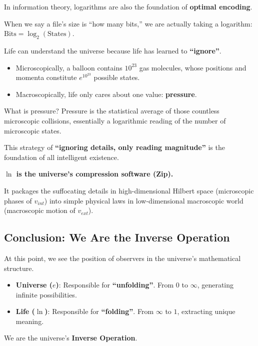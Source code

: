 \documentclass[11pt,a4paper,twoside]{book}
\begin{document}
In information theory, logarithms are also the foundation of \textbf{optimal encoding}.

When we say a file's size is ``how many bits,'' we are actually taking a logarithm: $\text{Bits} = \log_2(\text{States})$.

Life can understand the universe because life has learned to \textbf{``ignore''}.

\begin{itemize}
\item Microscopically, a balloon contains $10^{23}$ gas molecules, whose positions and momenta constitute $e^{10^{23}}$ possible states.

\item Macroscopically, life only cares about one value: \textbf{pressure}.
\end{itemize}

What is pressure? Pressure is the statistical average of those countless microscopic collisions, essentially a logarithmic reading of the number of microscopic states.

This strategy of \textbf{``ignoring details, only reading magnitude''} is the foundation of all intelligent existence.

\textbf{$\ln$ is the universe's compression software (Zip).}

It packages the suffocating details in high-dimensional Hilbert space (microscopic phases of $v_{int}$) into simple physical laws in low-dimensional macroscopic world (macroscopic motion of $v_{ext}$).

\subsection{Conclusion: We Are the Inverse Operation}

At this point, we see the position of observers in the universe's mathematical structure.

\begin{itemize}
\item \textbf{Universe ($e$)}: Responsible for \textbf{``unfolding''}. From $0$ to $\infty$, generating infinite possibilities.

\item \textbf{Life ($\ln$)}: Responsible for \textbf{``folding''}. From $\infty$ to $1$, extracting unique meaning.
\end{itemize}

We are the universe's \textbf{Inverse Operation}.
\end{document}
